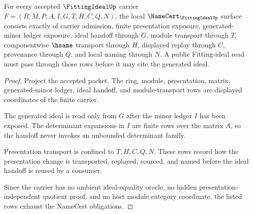 \begin{theorem}
\label{thm:fitting-ideal-minor-ledger-obligations}
For every accepted $\FittingIdealUp$ carrier $F=(R,M,P,A,I,G,T,H,C,Q,N)$, the local $\NameCert_{\FittingIdealUp}$ surface consists exactly of carrier admission, finite presentation exposure, generated-minor ledger exposure, ideal handoff through $G$, module transport through $T$, componentwise $\hsame$ transport through $H$, displayed replay through $C$, provenance through $Q$, and local naming through $N$. A public Fitting-ideal read must pass through those rows before it may cite the generated ideal.
\end{theorem}
\begin{proof}
Project the accepted packet. The ring, module, presentation, matrix, generated-minor ledger, ideal handoff, and module-transport rows are displayed coordinates of the finite carrier.

The generated ideal is read only from $G$ after the minor ledger $I$ has been exposed. The determinant expansions in $I$ are finite rows over the matrix $A$, so the handoff never invokes an unbounded determinant family.

Presentation transport is confined to $T,H,C,Q,N$. These rows record how the presentation change is transported, replayed, sourced, and named before the ideal handoff is reused by a consumer.

Since the carrier has no ambient ideal-equality oracle, no hidden presentation-independent quotient proof, and no host module category coordinate, the listed rows exhaust the NameCert obligations.
\end{proof}

\begin{closurestatus}{\FittingIdealUp}
  \theoryclosure{\seedClosure}
  \formalstatus{\unformalizedV}
\end{closurestatus}
